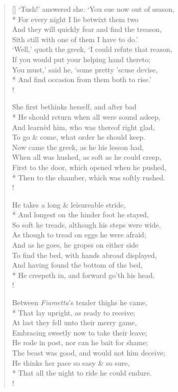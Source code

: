 \documentclass[MAIN]{subfiles}
\begin{document}
\begin{verse}[\versewidth]
`Tush!' answered she. `You sue now out of season,\\*
\vin For every night I lie betwixt them two\\
And they will quickly fear and find the treason,\\
\vin Sith still with one of them I have to do.'\\
`Well,' quoth the greek, `I could refute that reason,\\
\vin If you would put your helping hand thereto;\\
You must,' said he, `some pretty 'scuse devise,\\*
And find occasion from them both to rise.'\\!

She first bethinks herself, and after bad\\*
\vin He should return when all were sound asleep,\\
And learn\`ed him, who was thereof right glad,\\
\vin To go \& come, what order he should keep.\\
Now came the greek, as he his lesson had,\\
\vin When all was hushed, as soft as he could creep,\\
First to the door, which opened when he pushed,\\*
Then to the chamber, which was softly rushed.\\!

He takes a long \& leisureable stride,\\*
\vin And longest on the hinder foot he stayed,\\
So soft he treads, although his steps were wide,\\
\vin As though to tread on eggs he were afraid;\\
And as he goes, he gropes on either side\\
\vin To find the bed, with hands abroad displayed,\\
And having found the bottom of the bed,\\*
He creepeth in, and forward go'th his head.\\!

Between \emph{Fiametta}'s tender thighs he came,\\*
\vin That lay upright, as ready to receive;\\
At last they fell unto their merry game,\\
\vin Embracing sweetly now to take their leave;\\
He rode in post, nor can he bait for shame;\\
\vin The beast was good, and would not him deceive;\\
He thinks her pace so easy \& so sure,\\*
That all the night to ride he could endure.\\!


\end{verse}
\end{document}
